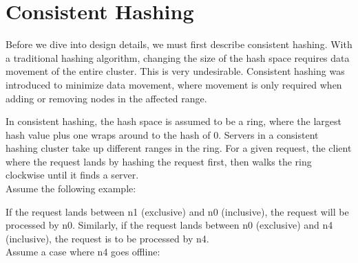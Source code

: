 \section{Consistent Hashing}

Before we dive into design details, we must first describe consistent hashing.
With a traditional hashing algorithm, changing the size of the hash space
requires data movement of the entire cluster. This is very undesirable.
Consistent hashing was introduced to minimize data movement, where movement is
only required when adding or removing nodes in the affected range. 

In consistent hashing, the hash space is assumed to be a ring, where the largest
hash value plus one wraps around to the hash of 0. Servers in a consistent
hashing cluster take up different ranges in the ring. For a given request, the
client where the request lands by hashing the request first, then walks the ring
clockwise until it finds a server. \\ 

Assume the following example:

\begin{center}
\end{center}

If the request lands between n1 (exclusive) and n0 (inclusive), the request will
be processed by n0. Similarly, if the request lands between n0 (exclusive) and
n4 (inclusive), the request is to be processed by n4.\\

Assume a case where n4 goes offline: 

\begin{center}
\end{center}

